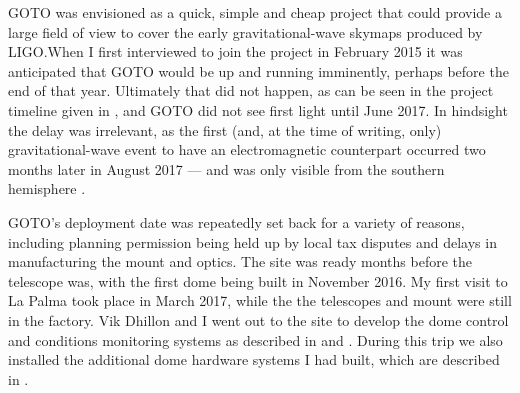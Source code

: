 \begin{colsection}

GOTO was envisioned as a quick, simple and cheap project that could provide a large field of view to cover the early gravitational-wave skymaps produced by LIGO.\@ When I first interviewed to join the project in February 2015 it was anticipated that GOTO would be up and running imminently, perhaps before the end of that year. Ultimately that did not happen, as can be seen in the project timeline given in , and GOTO did not see first light until June 2017. In hindsight the delay was irrelevant, as the first (and, at the time of writing, only) gravitational-wave event to have an electromagnetic counterpart occurred two months later in August 2017 --- and was only visible from the southern hemisphere \citep{GW170817,GW170817_followup}.

GOTO's deployment date was repeatedly set back for a variety of reasons, including planning permission being held up by local tax disputes and delays in manufacturing the mount and optics. The site was ready months before the telescope was, with the first dome being built in November 2016. My first visit to La Palma took place in March 2017, while the the telescopes and mount were still in the factory. Vik Dhillon and I went out to the site to develop the dome control and conditions monitoring systems as described in  and . During this trip we also installed the additional dome hardware systems I had built, which are described in .


\end{colsection}
